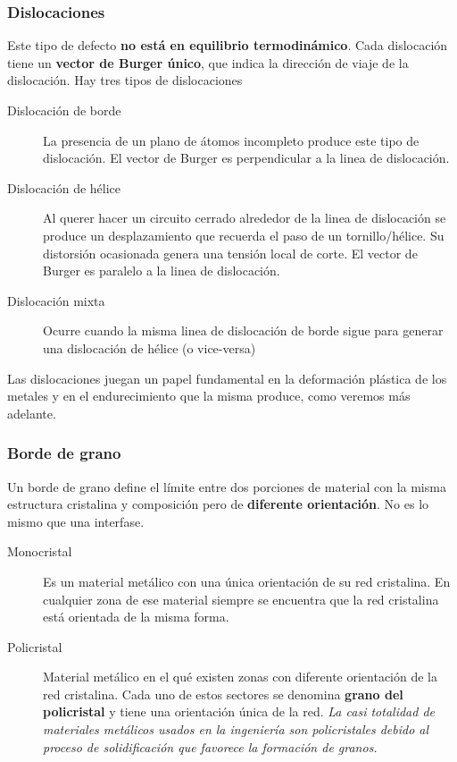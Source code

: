 \subsubsection{Dislocaciones}

Este tipo de defecto \textbf{no está en equilibrio termodinámico}. Cada dislocación tiene un \textbf{vector de Burger único}, que indica la dirección de viaje de la dislocación.
Hay tres tipos de dislocaciones

\begin{description}
    \item[Dislocación de borde] La presencia de un plano de átomos incompleto produce este tipo de dislocación. El vector de Burger es perpendicular a la linea de dislocación.
    \item[Dislocación de hélice] Al querer hacer un circuito cerrado alrededor de la linea de dislocación se produce un desplazamiento que recuerda el paso de un tornillo/hélice. Su distorsión ocasionada genera una tensión local de corte.  El vector de Burger es paralelo a la linea de dislocación.
    \item[Dislocación mixta] Ocurre cuando la misma linea de dislocación de borde sigue para generar una dislocación de hélice (o vice-versa)
\end{description}

Las dislocaciones juegan un papel fundamental en la deformación plástica de los metales y en el endurecimiento que la misma produce, como veremos más adelante.

\subsubsection{Borde de grano}

Un borde de grano define el límite entre dos porciones de material con la misma estructura cristalina y composición pero de \textbf{diferente orientación}. No es lo mismo que una interfase.

\begin{description}
    \item[Monocristal] Es un material metálico con una única orientación de su red cristalina. En cualquier zona de ese material siempre se encuentra que la red cristalina está orientada de la misma forma.
    \item[Policristal] Material metálico en el qué existen zonas con diferente orientación de la red cristalina. Cada uno de estos sectores se denomina \textbf{grano del policristal} y tiene una orientación única de la red. \textit{La casi totalidad de materiales metálicos usados en la ingeniería son policristales debido al proceso de solidificación que favorece la formación de granos.}
\end{description}

